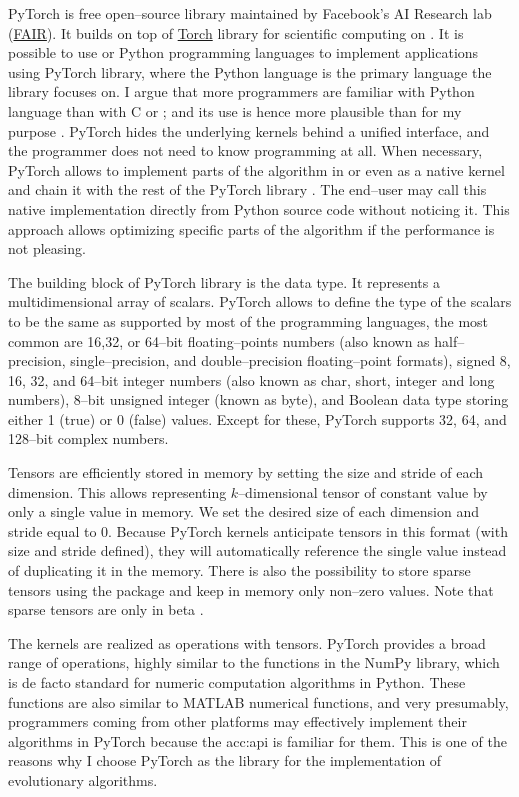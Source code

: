 PyTorch is free open--source library maintained by Facebook's AI Research lab (\href{https://ai.facebook.com/}{FAIR}). It builds on top of \href{http://torch.ch/}{Torch} library for scientific computing on \gpuns. It is possible to use \cpp or Python programming languages to implement applications using PyTorch library, where the Python language is the primary language the library focuses on. I argue that more programmers are familiar with Python language than with C or \cppns; and its use is hence more plausible than \cuda for my purpose \citep{StackOverflowSurvey}. PyTorch hides the underlying kernels behind a unified interface, and the programmer does not need to know \cuda programming at all. When necessary, PyTorch allows to implement parts of the algorithm in \cpp or even as a native \cuda kernel and chain it with the rest of the PyTorch library \citep{PyTorchDoc}. The end--user may call this native implementation directly from Python source code without noticing it. This approach allows optimizing specific parts of the algorithm if the performance is not pleasing.

The building block of PyTorch library is the  data type. It represents a multidimensional array of scalars. PyTorch allows to define the type of the scalars to be the same as supported by most of the programming languages, the most common are 16,32, or 64--bit floating--points numbers (also known as half--precision, single--precision, and double--precision floating--point formats), signed 8, 16, 32, and 64--bit integer numbers (also known as char, short, integer and long numbers), 8--bit unsigned integer (known as byte), and Boolean data type storing either 1 (true) or 0 (false) values. Except for these, PyTorch supports 32, 64, and 128--bit complex numbers.

Tensors are efficiently stored in memory by setting the size and stride of each dimension. This allows representing $k$--dimensional tensor of constant value by only a single value in memory. We set the desired size of each dimension and stride equal to $0$. Because PyTorch kernels anticipate tensors in this format (with size and stride defined), they will automatically reference the single value instead of duplicating it in the memory. There is also the possibility to store sparse tensors using the  package and keep in memory only non--zero values. Note that sparse tensors are only in beta \citep{PyTorchDoc}.

The kernels are realized as operations with tensors. PyTorch provides a broad range of operations, highly similar to the functions in the NumPy library, which is de facto standard for numeric computation algorithms in Python. These functions are also similar to MATLAB numerical functions, and very presumably, programmers coming from other platforms may effectively implement their algorithms in PyTorch because the \acrshort{acc:api} is familiar for them. This is one of the reasons why I choose PyTorch as the library for the implementation of evolutionary algorithms.

